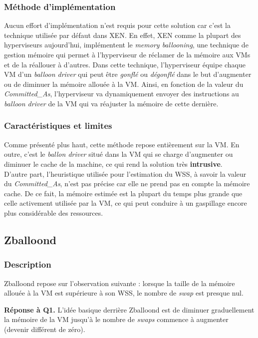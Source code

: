 \subsubsection{Méthode d'implémentation}
Aucun effort d'implémentation n'est requis pour cette solution car c'est la technique utilisée par défaut dans XEN. En effet, XEN comme la plupart des hyperviseurs aujourd'hui, implémentent le \textit{memory ballooning}\cite{article9, article10}, une technique de gestion mémoire qui permet à l'hyperviseur de réclamer de la mémoire aux VMs et de la réallouer à d'autres. Dans cette technique, l'hyperviseur équipe chaque VM d'un \textit{balloon driver} qui peut être \textit{gonflé} ou \textit{dégonflé} dans le but d'augmenter ou de diminuer la mémoire allouée à la VM. Ainsi, en fonction de la valeur du \textit{Committed\_As}, l'hyperviseur va dynamiquement envoyer des instructions au \textit{balloon driver} de la VM qui va réajuster la mémoire de cette dernière.

\subsubsection{Caractéristiques et limites}
Comme présenté plus haut, cette méthode repose entièrement sur la VM. En outre, c'est le \textit{ballon driver} situé dans la VM qui se charge d'augmenter ou diminuer le cache de la machine, ce qui rend la solution très \textbf{intrusive}.\\
D'autre part, l'heuristique utilisée pour l'estimation du WSS, à savoir la valeur du \textit{Committed\_As}, n'est pas précise car elle ne prend pas en compte la mémoire cache. De ce fait, la mémoire estimée est la plupart du temps plus grande que celle activement utilisée par la VM, ce qui peut conduire à un gaspillage encore plus considérable des ressources.

\subsection{Zballoond}

\subsubsection{Description}
Zballoond \cite{zballoond} repose sur l'observation suivante : lorsque la taille de la mémoire allouée à la VM est supérieure à son WSS, le nombre de \textit{swap} est presque nul.
\par{\textbf{Réponse à Q1.}} L'idée basique derrière Zballoond est de diminuer graduellement la mémoire de la VM jusqu'à le nombre de \textit{swaps} commence à augmenter (devenir différent de zéro).

